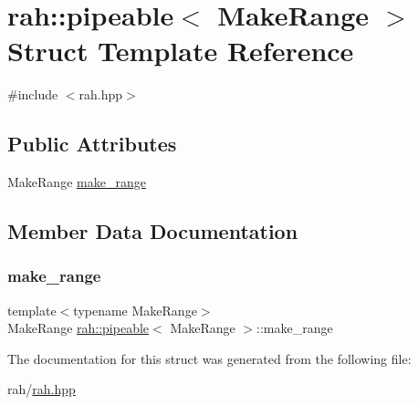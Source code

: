 \hypertarget{structrah_1_1pipeable}{}\section{rah\+::pipeable$<$ Make\+Range $>$ Struct Template Reference}
\label{structrah_1_1pipeable}


{\ttfamily \#include $<$rah.\+hpp$>$}

\subsection*{Public Attributes}
\begin{DoxyCompactItemize}
\item 
Make\+Range \mbox{\hyperlink{structrah_1_1pipeable_aebc25016787b2e3c437ceb322705ed47}{make\+\_\+range}}
\end{DoxyCompactItemize}


\subsection{Member Data Documentation}
\mbox{\label{structrah_1_1pipeable_aebc25016787b2e3c437ceb322705ed47}} 
\subsubsection{\texorpdfstring{make\_range}{make\_range}}
{\footnotesize\ttfamily template$<$typename Make\+Range$>$ \\
Make\+Range \mbox{\hyperlink{structrah_1_1pipeable}{rah\+::pipeable}}$<$ Make\+Range $>$\+::make\+\_\+range}



The documentation for this struct was generated from the following file\+:\begin{DoxyCompactItemize}
\item 
rah/\mbox{\hyperlink{rah_8hpp}{rah.\+hpp}}\end{DoxyCompactItemize}
